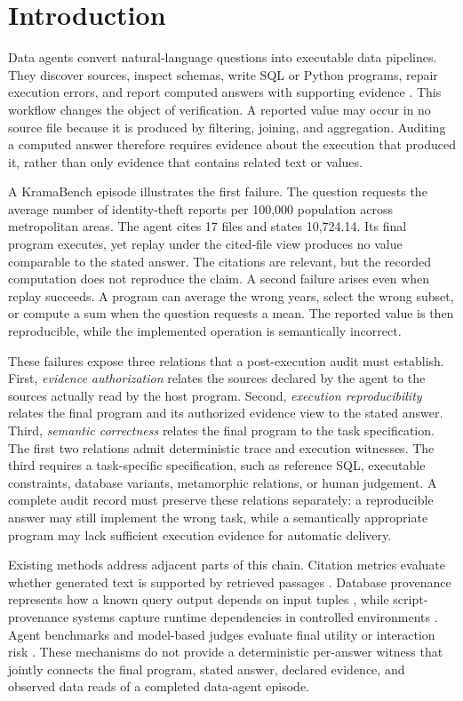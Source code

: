 \documentclass[5p,times]{elsarticle}
\begin{document}
\section{Introduction}\label{sec:intro}

Data agents convert natural-language questions into executable
data pipelines. They discover sources, inspect schemas, write SQL
or Python programs, repair execution errors, and report computed
answers with supporting evidence
\citep{kramabench2025,dabstep2025,lakeqa2026}.
This workflow changes the object of verification. A reported value
may occur in no source file because it is produced by filtering,
joining, and aggregation. Auditing a computed answer therefore
requires evidence about the execution that produced it, rather than
only evidence that contains related text or values.

A KramaBench episode illustrates the first failure. The question
requests the average number of identity-theft reports per 100,000
population across metropolitan areas. The agent cites 17 files and
states 10,724.14. Its final program executes, yet replay under the
cited-file view produces no value comparable to the stated answer.
The citations are relevant, but the recorded computation does not
reproduce the claim. A second failure arises even when replay
succeeds. A program can average the wrong years, select the wrong
subset, or compute a sum when the question requests a mean. The
reported value is then reproducible, while the implemented operation
is semantically incorrect.

These failures expose three relations that a post-execution audit
must establish. First, \emph{evidence authorization} relates the
sources declared by the agent to the sources actually read by the
host program. Second, \emph{execution reproducibility} relates the
final program and its authorized evidence view to the stated answer.
Third, \emph{semantic correctness} relates the final program to the
task specification. The first two relations admit deterministic
trace and execution witnesses. The third requires a task-specific
specification, such as reference SQL, executable constraints,
database variants, metamorphic relations, or human judgement.
A complete audit record must preserve these relations separately:
a reproducible answer may still implement the wrong task, while a
semantically appropriate program may lack sufficient execution
evidence for automatic delivery.

Existing methods address adjacent parts of this chain. Citation
metrics evaluate whether generated text is supported by retrieved
passages \citep{gao2023alce,min2023factscore}. Database provenance
represents how a known query output depends on input tuples
\citep{green2007provenance,cheney2009provenance,
amsterdamer2011aggregate}, while script-provenance systems capture
runtime dependencies in controlled environments
\citep{murta2014noworkflow,namaki2020vamsa}. Agent benchmarks and
model-based judges evaluate final utility or interaction risk
\citep{ruan2024toolemu,debenedetti2024agentdojo,kramabench2025,
sana2026}. These mechanisms do not provide a deterministic
per-answer witness that jointly connects the final program, stated
answer, declared evidence, and observed data reads of a completed
data-agent episode.
\end{document}
